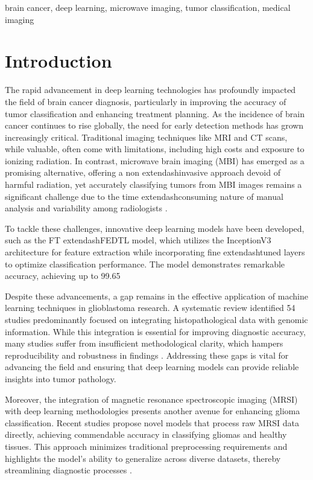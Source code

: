 \documentclass[runningheads]{llncs}
\begin{document}
\begin{keywords}
brain cancer, deep learning, microwave imaging, tumor classification, medical imaging
\end{keywords}

\section{Introduction}
The rapid advancement in deep learning technologies has profoundly impacted the field of brain cancer diagnosis, particularly in improving the accuracy of tumor classification and enhancing treatment planning. As the incidence of brain cancer continues to rise globally, the need for early detection methods has grown increasingly critical. Traditional imaging techniques like MRI and CT scans, while valuable, often come with limitations, including high costs and exposure to ionizing radiation. In contrast, microwave brain imaging (MBI) has emerged as a promising alternative, offering a non	extendash{}invasive approach devoid of harmful radiation, yet accurately classifying tumors from MBI images remains a significant challenge due to the time	extendash{}consuming nature of manual analysis and variability among radiologists \cite{Hossain_2024}.

To tackle these challenges, innovative deep learning models have been developed, such as the FT	extendash{}FEDTL model, which utilizes the InceptionV3 architecture for feature extraction while incorporating fine	extendash{}tuned layers to optimize classification performance. The model demonstrates remarkable accuracy, achieving up to 99.65%

Despite these advancements, a gap remains in the effective application of machine learning techniques in glioblastoma research. A systematic review identified 54 studies predominantly focused on integrating histopathological data with genomic information. While this integration is essential for improving diagnostic accuracy, many studies suffer from insufficient methodological clarity, which hampers reproducibility and robustness in findings \cite{Chun_2025}. Addressing these gaps is vital for advancing the field and ensuring that deep learning models can provide reliable insights into tumor pathology.

Moreover, the integration of magnetic resonance spectroscopic imaging (MRSI) with deep learning methodologies presents another avenue for enhancing glioma classification. Recent studies propose novel models that process raw MRSI data directly, achieving commendable accuracy in classifying gliomas and healthy tissues. This approach minimizes traditional preprocessing requirements and highlights the model's ability to generalize across diverse datasets, thereby streamlining diagnostic processes \cite{Erin_2025}.
\end{document}
